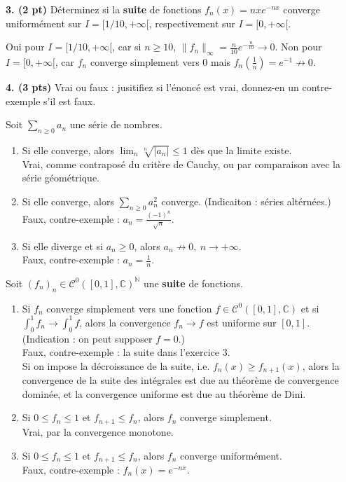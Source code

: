 \documentclass[a4paper,10pt]{article}
\newcommand{\N}{\mathbb{N}}
\newcommand{\C}{\mathbb{C}}
\newcommand{\norm}[1]{\|#1\|}
\newcommand{\abs}[1]{\left|#1\right|}
\newcommand{\correction}[1]{{\color{red}#1}}
\newcommand{\comment}[1]{{\color{blue}#1}}
\begin{document}
\vspace{.1in}

\noindent
\textbf{3. (2 pt)}
Déterminez si la \textbf{suite} de fonctions $f_n(x)=nxe^{-nx}$ converge uniformément sur $I=[1/10,+\infty[$, respectivement sur $I=[0,+\infty[$. 

\correction{Oui pour $I=[1/10,+\infty[$, car si $n\geq 10$, $\norm{f_n}_\infty=\frac{n}{10}e^{-\frac{n}{10}}\to 0$. Non pour $I=[0,+\infty[$, car $f_n$ converge simplement vers 0 mais $f_n(\frac{1}{n})=e^{-1}\not\to0$.}

\vspace{.1in}

\noindent
\textbf{4. (3 pts)} Vrai ou faux : jusitifiez si l'énoncé est vrai, donnez-en un contre-exemple s'il est faux.

\noindent
Soit $\sum_{n\geq0} a_n$ une série de nombres.
\begin{enumerate}[label=\alph*)]
    \item Si elle converge, alors $\lim_n\sqrt[n]{\abs{a_n}} \leq 1$ dès que la limite existe.\\
    \correction{Vrai, comme contraposé du critère de Cauchy, ou par comparaison avec la série géométrique.}
    \item Si elle converge, alors $\sum_{n\geq0} a_n^2$ converge. (Indicaiton : séries altérnées.)\\
    \correction{Faux, contre-exemple : $a_n=\frac{(-1)^n}{\sqrt{n}}$.}
    \item Si elle diverge et si $a_n\geq0$, alors $a_n \not\to 0,~n\to+\infty$.\\
    \correction{Faux, contre-exemple : $a_n=\frac{1}{n}$.}
\end{enumerate}
Soit $(f_n)_n\in\mathcal{C}^0([0,1],\C)^\N$ une \textbf{suite} de fonctions.
\begin{enumerate}[resume*]
    \item Si $f_n$ converge simplement vers une fonction $f\in\mathcal{C}^0([0,1],\C)$ et si $\int_0^1f_n \to \int_0^1 f$, alors la convergence $f_n \to f$ est uniforme sur $[0,1]$. (Indication : on peut supposer $f=0$.)\\
    \correction{Faux, contre-exemple : la suite dans l'exercice 3.}\\
    \comment{Si on impose la décroissance de la suite, i.e. $f_n(x)\geq f_{n+1}(x)$, alors la convergence de la suite des intégrales est due au théorème de convergence dominée, et la convergence uniforme est due au théorème de Dini.}
    \item Si $0 \leq f_n \leq 1$ et $f_{n+1}\leq f_n$, alors $f_n$ converge simplement.\\
    \correction{Vrai, par la convergence monotone.}
    \item Si $0 \leq f_n \leq 1$ et $f_{n+1}\leq f_n$, alors $f_n$ converge uniformément.\\
    \correction{Faux, contre-exemple : $f_n(x)=e^{-nx}$.}
\end{enumerate}
\end{document}
